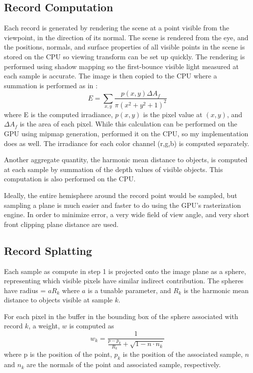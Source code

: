 \documentclass[10pt,twopage]{acmsiggraph}
\begin{document}
\subsection{Record Computation}
Each record is generated by rendering the scene at a point visible from the viewpoint, in the direction of its normal.  The scene is rendered from the eye, and the positions, normals, and surface properties of all visible points in the scene is stored on the CPU so viewing transform can be set up quickly.  The rendering is performed using shadow mapping so the first-bounce visible light measured at each sample is accurate.  The image is then copied to the CPU where a summation is performed as in \cite{lco4}: 
$$
E = \sum_{x,y}\frac{p(x,y)\Delta A_f}{\pi(x^2 + y^2 +1)^2}
$$
where E is the computed irradiance, $p(x,y)$ is the pixel value at $(x,y)$,  and $\Delta A_f$ is the area of each pixel.  While this calculation can be performed on the GPU using mipmap generation, \cite{mainpaper} performed it on the CPU, so my implementation does as well.  The irradiance for each color channel (r,g,b) is computed separately.

Another aggregate quantity, the harmonic mean distance to objects, is computed at each sample by summation of the depth values of visible objects.  This computation is also performed on the CPU.

Ideally, the entire hemisphere around the record point would be sampled, but sampling a plane is much easier and faster to do using the GPU's rasterization engine.  In order to minimize error, a very wide field of view angle, and very short front clipping plane distance are used.    

\subsection{Record Splatting}
Each sample as compute in step 1 is projected onto the image plane as a sphere, representing which visible pixels have similar indirect contribution.  The spheres have radius = $aR_k$ where $a$ is a tunable parameter, and $R_k$ is the harmonic mean distance to objects visible at sample $k$.

For each pixel in the buffer in the bounding box of the sphere associated with record $k$, a weight, $w$ is computed as
$$
w_k = \frac{1}{\frac{p - p_k}{R_k} + \sqrt{1 - n \cdot n_k}}
$$
where p is the position of the point, $p_k$ is the position of the associated sample, $n$ and $n_k$ are the normals of the point and associated sample, respectively.
\end{document}
